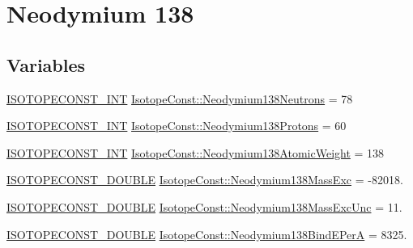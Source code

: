 \hypertarget{group___isotope_const-_neodymium-_nd138}{}\section{Neodymium 138}
\label{group___isotope_const-_neodymium-_nd138}
\subsection*{Variables}
\begin{DoxyCompactItemize}
\item 
\mbox{\hyperlink{group___isotope_const-_macros_ga5f18360b3e99483a35c32d789e62621c}{I\+S\+O\+T\+O\+P\+E\+C\+O\+N\+S\+T\+\_\+\+I\+NT}} \mbox{\hyperlink{group___isotope_const-_neodymium-_nd138_gaac60cf0a11778f8f27d409ef7a89de51}{Isotope\+Const\+::\+Neodymium138\+Neutrons}} = 78
\item 
\mbox{\hyperlink{group___isotope_const-_macros_ga5f18360b3e99483a35c32d789e62621c}{I\+S\+O\+T\+O\+P\+E\+C\+O\+N\+S\+T\+\_\+\+I\+NT}} \mbox{\hyperlink{group___isotope_const-_neodymium-_nd138_ga68b85557cd18517c9e52c9b9fc65f780}{Isotope\+Const\+::\+Neodymium138\+Protons}} = 60
\item 
\mbox{\hyperlink{group___isotope_const-_macros_ga5f18360b3e99483a35c32d789e62621c}{I\+S\+O\+T\+O\+P\+E\+C\+O\+N\+S\+T\+\_\+\+I\+NT}} \mbox{\hyperlink{group___isotope_const-_neodymium-_nd138_ga9a1e5721dac0eb503fa955b8e1f1f4f3}{Isotope\+Const\+::\+Neodymium138\+Atomic\+Weight}} = 138
\item 
\mbox{\hyperlink{group___isotope_const-_macros_ga8f45a7272ce02c0b4c65c44636ed719a}{I\+S\+O\+T\+O\+P\+E\+C\+O\+N\+S\+T\+\_\+\+D\+O\+U\+B\+LE}} \mbox{\hyperlink{group___isotope_const-_neodymium-_nd138_gaef00800b5f5096445c9948e85f7b1ddc}{Isotope\+Const\+::\+Neodymium138\+Mass\+Exc}} = -\/82018.
\item 
\mbox{\hyperlink{group___isotope_const-_macros_ga8f45a7272ce02c0b4c65c44636ed719a}{I\+S\+O\+T\+O\+P\+E\+C\+O\+N\+S\+T\+\_\+\+D\+O\+U\+B\+LE}} \mbox{\hyperlink{group___isotope_const-_neodymium-_nd138_gaab4ca36eefae549746052fa3817d16ca}{Isotope\+Const\+::\+Neodymium138\+Mass\+Exc\+Unc}} = 11.
\item 
\mbox{\hyperlink{group___isotope_const-_macros_ga8f45a7272ce02c0b4c65c44636ed719a}{I\+S\+O\+T\+O\+P\+E\+C\+O\+N\+S\+T\+\_\+\+D\+O\+U\+B\+LE}} \mbox{\hyperlink{group___isotope_const-_neodymium-_nd138_ga5a2c9959d772ce1b356ebd9158945201}{Isotope\+Const\+::\+Neodymium138\+Bind\+E\+PerA}} = 8325.
\item 

\end{DoxyCompactItemize}
